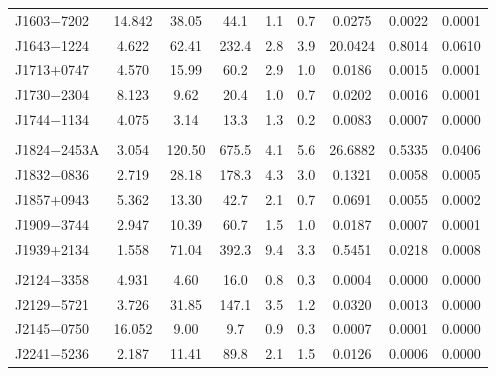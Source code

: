\documentclass[useAMS,usenatbib]{mn2e}
\begin{document}
\begin{table}
\begin{center}
\begin{tabular}{lcccccccc}
J1603$-$7202&  14.842 &  38.05            & 44.1     & 1.1       & 0.7       &    0.0275  &  0.0022  &  0.0001  \\ 
J1643$-$1224&  4.622  &  62.41            & 232.4    & 2.8       & 3.9       &    20.0424  &  0.8014  &  0.0610  \\ 
J1713$+$0747&  4.570  &  15.99            & 60.2     & 2.9       & 1.0       &    0.0186  &  0.0015  &  0.0001  \\ 
J1730$-$2304&  8.123  &  9.62             & 20.4     & 1.0       & 0.7       &    0.0202  &  0.0016  &  0.0001  \\ 
J1744$-$1134&  4.075  &  3.14             & 13.3     & 1.3       & 0.2       &    0.0083  &  0.0007  &  0.0000  \\ 
            &         &                   &          &           &           &            &          &          \\
J1824$-$2453A&  3.054  &  120.50           & 675.5    & 4.1       & 5.6       &    26.6882  &  0.5335  &  0.0406  \\ 
J1832$-$0836&  2.719  &  28.18            & 178.3    & 4.3       & 3.0       &    0.1321  &  0.0058  &  0.0005  \\ 
J1857$+$0943&  5.362  &  13.30            & 42.7     & 2.1       & 0.7       &    0.0691  &  0.0055  &  0.0002  \\ 
J1909$-$3744&  2.947  &  10.39            & 60.7     & 1.5       & 1.0       &    0.0187  &  0.0007  &  0.0001  \\ 
J1939$+$2134&  1.558  &  71.04            & 392.3    & 9.4       & 3.3       &    0.5451  &  0.0218  &  0.0008  \\ 
            &         &                   &          &           &           &            &          &          \\
J2124$-$3358&  4.931  &  4.60             & 16.0     & 0.8       & 0.3       &    0.0004  &  0.0000  &  0.0000  \\ 
J2129$-$5721&  3.726  &  31.85            & 147.1    & 3.5       & 1.2       &    0.0320  &  0.0013  &  0.0000  \\ 
J2145$-$0750&  16.052 &  9.00             & 9.7      & 0.9       & 0.3       &    0.0007  &  0.0001  &  0.0000  \\ 
J2241$-$5236&  2.187  &  11.41            & 89.8     & 2.1       & 1.5       &    0.0126  &  0.0006  &  0.0000  \\ 
%
\hline
\end{tabular}
\end{center}
\end{table}
\end{document}
